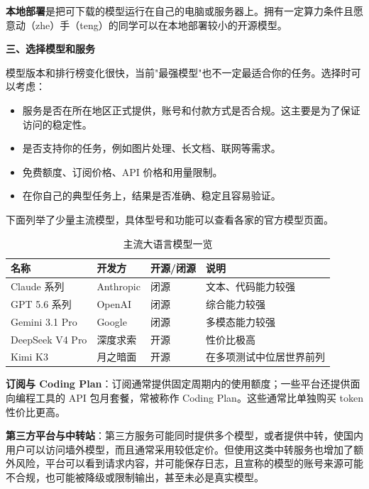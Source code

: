 \documentclass[11pt,oneside]{book}
\begin{document}
\textbf{本地部署}是把可下载的模型运行在自己的电脑或服务器上。拥有一定算力条件且愿意动（zhe）手（teng）的同学可以在本地部署较小的开源模型。

\vspace{10pt}

\textbf{三、选择模型和服务}

模型版本和排行榜变化很快，当前"最强模型"也不一定最适合你的任务。选择时可以考虑：

\begin{itemize}
    \item 服务是否在所在地区正式提供，账号和付款方式是否合规。这主要是为了保证访问的稳定性。
    \item 是否支持你的任务，例如图片处理、长文档、联网等需求。
    \item 免费额度、订阅价格、API 价格和用量限制。
    \item 在你自己的典型任务上，结果是否准确、稳定且容易验证。
\end{itemize}

下面列举了少量主流模型，具体型号和功能可以查看各家的官方模型页面。

\begin{table}[htbp]
\centering
\begin{tabular}{llll}
\hline
名称 & 开发方 & 开源/闭源 & 说明 \\
\hline
Claude 系列 & Anthropic & 闭源 & 文本、代码能力较强 \\
GPT 5.6 系列 & OpenAI & 闭源 & 综合能力较强 \\
Gemini 3.1 Pro & Google & 闭源 & 多模态能力较强 \\
DeepSeek V4 Pro & 深度求索 & 开源 & 性价比极高 \\
Kimi K3 & 月之暗面 & 开源 & 在多项测试中位居世界前列 \\
\hline
\end{tabular}
\caption{主流大语言模型一览}
\end{table}

\textbf{订阅与 Coding Plan}：订阅通常提供固定周期内的使用额度；一些平台还提供面向编程工具的 API 包月套餐，常被称作 Coding Plan。这些通常比单独购买 token 性价比更高。

\textbf{第三方平台与中转站}：第三方服务可能同时提供多个模型，或者提供中转，使国内用户可以访问墙外模型，而且通常采用较低定价。但使用这类中转服务也增加了额外风险，平台可以看到请求内容，并可能保存日志，且宣称的模型的账号来源可能不合规，也可能被降级或限制输出，甚至未必是真实模型。

\vspace{10pt}
\end{document}
